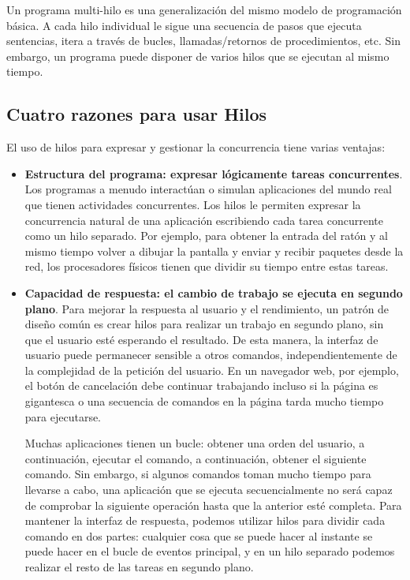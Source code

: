 \documentclass[10pt]{book}
\begin{document}
Un programa multi-hilo es una generalización del mismo modelo de programación básica. A cada hilo individual le sigue una secuencia de pasos que ejecuta sentencias, itera a través de bucles, llamadas/retornos de procedimientos, etc. Sin embargo, un programa puede disponer de varios hilos que se ejecutan al mismo tiempo.

\subsection{Cuatro razones para usar Hilos}
El uso de hilos para expresar y gestionar la concurrencia tiene varias ventajas:
\begin{itemize}
\item \textbf{Estructura del programa: expresar lógicamente tareas concurrentes}. Los programas a menudo interactúan o simulan aplicaciones del mundo real que tienen actividades concurrentes. Los hilos le permiten expresar la concurrencia natural de una aplicación escribiendo cada tarea concurrente como un hilo separado. Por ejemplo, para obtener la entrada del ratón y al mismo tiempo volver a dibujar la pantalla y enviar y recibir paquetes desde la red, los procesadores físicos tienen que dividir su tiempo entre estas tareas.

\item \textbf{Capacidad de respuesta: el cambio de trabajo se ejecuta en segundo plano}. Para mejorar la respuesta al usuario y el rendimiento, un patrón de diseño común es crear hilos para realizar un trabajo en segundo plano, sin que el usuario esté esperando el resultado. De esta manera, la interfaz de usuario puede permanecer sensible a otros comandos, independientemente de la complejidad de la petición del usuario. En un navegador web, por ejemplo, el botón de cancelación debe continuar trabajando incluso si la página es gigantesca o una secuencia de comandos en la página tarda mucho tiempo para ejecutarse.

Muchas aplicaciones tienen un bucle: obtener una orden del usuario, a continuación, ejecutar el comando, a continuación, obtener el siguiente comando. Sin embargo, si algunos comandos toman mucho tiempo para llevarse a cabo, una aplicación que se ejecuta secuencialmente no será capaz de comprobar la siguiente operación hasta que la anterior esté completa. Para mantener la interfaz de respuesta, podemos utilizar hilos para dividir cada comando en dos partes: cualquier cosa que se puede hacer al instante se puede hacer en el bucle de eventos principal, y en un hilo separado podemos realizar el resto de las tareas en segundo plano.


\end{itemize}
\end{document}

